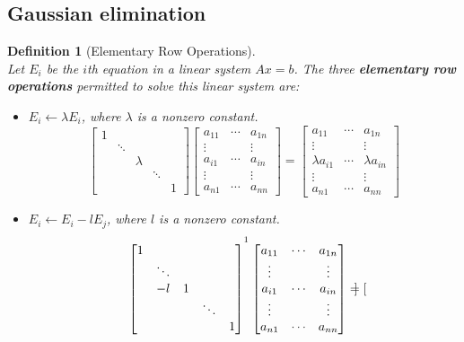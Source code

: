 \documentclass[12pt]{article}
\newtheorem{definition}{Definition}[section]
\theoremstyle{definition}
\begin{document}
\subsection{Gaussian elimination}
\begin{definition}[Elementary Row Operations]
\hfill\\\normalfont Let $E_i$ be the $i$th equation in a linear system $Ax=b$. The three \textbf{elementary row operations} permitted to solve this linear system are:
\begin{itemize}
\item $E_i\leftarrow \lambda E_i$, where $\lambda$ is a nonzero constant.
\[
\begin{bmatrix}
1&&&&\\
&\ddots&&&\\
&&\lambda&&\\
&&&\ddots&\\
&&&&1
\end{bmatrix}\begin{bmatrix}
a_{11}&\cdots&a_{1n}\\
\vdots&&\vdots\\
a_{i1}&\cdots&a_{in}\\
\vdots&&\vdots\\
a_{n1}&\cdots&a_{nn}
\end{bmatrix}=\begin{bmatrix}
a_{11}&\cdots&a_{1n}\\
\vdots&&\vdots\\
\lambda a_{i1}&\cdots&\lambda a_{in}\\
\vdots&&\vdots\\
a_{n1}&\cdots&a_{nn}
\end{bmatrix}
\]
\item $E_i\leftarrow E_i-lE_j$, where $l$ is a nonzero constant.
\[
\begin{bmatrix}
1&&&&\\
&\ddots&&&\\
&-l&1&&\\
&&&\ddots&\\
&&&&1
\end{bmatrix}^{\footnotemark}\begin{bmatrix}
a_{11}&\cdots&a_{1n}\\
\vdots&&\vdots\\
a_{i1}&\cdots&a_{in}\\
\vdots&&\vdots\\
a_{n1}&\cdots&a_{nn}
\end{bmatrix}=\begin{bmatrix}

\end{bmatrix}\]
\end{itemize}
\end{definition}
\end{document}
